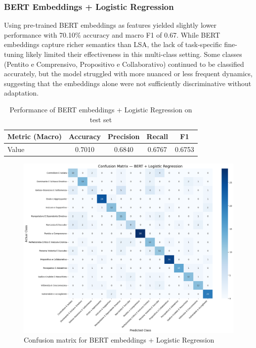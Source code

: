 \documentclass[conference]{IEEEtran}
\begin{document}
\vspace{1em}

\subsubsection{BERT Embeddings + Logistic Regression}
\noindent

Using pre-trained BERT embeddings as features yielded slightly lower performance with 70.10\% accuracy and macro F1 of 0.67. While BERT embeddings capture richer semantics than LSA, the lack of task-specific fine-tuning likely limited their effectiveness in this multi-class setting. Some classes (Pentito e Comprensivo, Propositivo e Collaborativo) continued to be classified accurately, but the model struggled with more nuanced or less frequent dynamics, suggesting that the embeddings alone were not sufficiently discriminative without adaptation.

\begin{table}[H]
  \centering
  \begin{tabular}{lcccc}
    \toprule
    \textbf{Metric (Macro)} & \textbf{Accuracy} & \textbf{Precision} & \textbf{Recall} & \textbf{F1} \\
    \midrule
    Value & 0.7010 & 0.6840 & 0.6767 & 0.6753 \\
    \bottomrule
  \end{tabular}
  \caption{Performance of BERT embeddings + Logistic Regression on test set}
\end{table}

\begin{figure}[H]
  \centering
  \includegraphics[width=\columnwidth]{figures/bert_logreg_confusion_matrix.png}
  \caption{Confusion matrix for BERT embeddings + Logistic Regression}
\end{figure}
\end{document}
